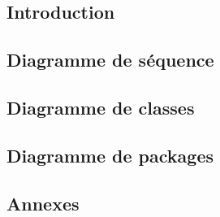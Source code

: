 \documentclass[asi]{picInsa}
\title{\DCP{}}
\author{\Florian{}, \Kafui{}, \Melissa{}, \Julie{}, \Mathieu{}} %
\begin{document}
\couverture{}

 \informationsGenerales{}


\tableofcontents

\setcounter{chapter}{0}


\chapter*{Introduction}
\label{intro}


\chapter{Diagramme de séquence}
\label{diagrammeSequence}


\chapter{Diagramme de classes}
\label{diagrammeClasse}


\chapter{Diagramme de packages}
\label{diagrammePackage}


\begin{appendix}
\part*{Annexes}

\listoffigures
{}
	 
\listoftables
{}
\end{appendix}
\pageQuatriemeCouverture
\end{document}
